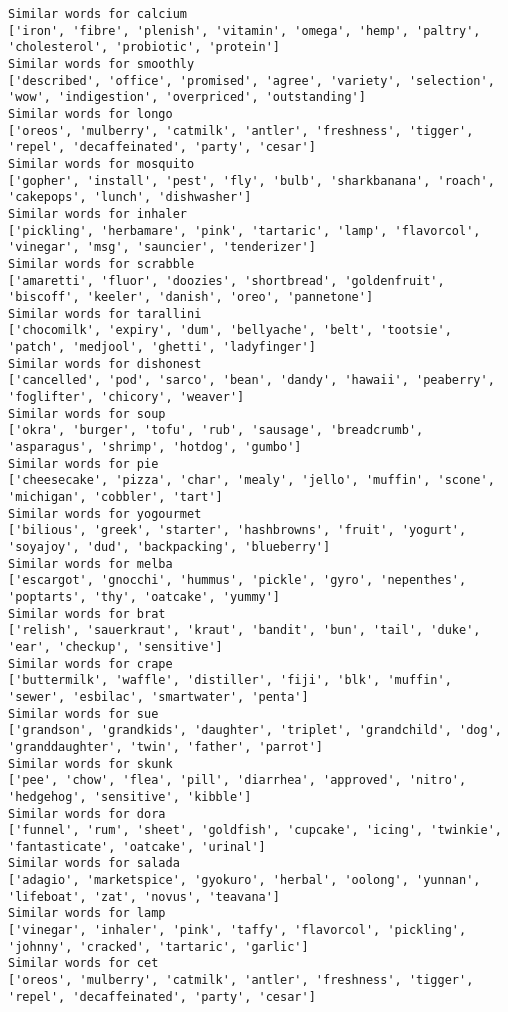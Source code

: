 \documentclass[11pt]{article}
\begin{document}
\begin{Verbatim}[commandchars=\\\{\}]
Similar words for calcium
['iron', 'fibre', 'plenish', 'vitamin', 'omega', 'hemp', 'paltry', 'cholesterol', 'probiotic', 'protein']
Similar words for smoothly
['described', 'office', 'promised', 'agree', 'variety', 'selection', 'wow', 'indigestion', 'overpriced', 'outstanding']
Similar words for longo
['oreos', 'mulberry', 'catmilk', 'antler', 'freshness', 'tigger', 'repel', 'decaffeinated', 'party', 'cesar']
Similar words for mosquito
['gopher', 'install', 'pest', 'fly', 'bulb', 'sharkbanana', 'roach', 'cakepops', 'lunch', 'dishwasher']
Similar words for inhaler
['pickling', 'herbamare', 'pink', 'tartaric', 'lamp', 'flavorcol', 'vinegar', 'msg', 'sauncier', 'tenderizer']
Similar words for scrabble
['amaretti', 'fluor', 'doozies', 'shortbread', 'goldenfruit', 'biscoff', 'keeler', 'danish', 'oreo', 'pannetone']
Similar words for tarallini
['chocomilk', 'expiry', 'dum', 'bellyache', 'belt', 'tootsie', 'patch', 'medjool', 'ghetti', 'ladyfinger']
Similar words for dishonest
['cancelled', 'pod', 'sarco', 'bean', 'dandy', 'hawaii', 'peaberry', 'foglifter', 'chicory', 'weaver']
Similar words for soup
['okra', 'burger', 'tofu', 'rub', 'sausage', 'breadcrumb', 'asparagus', 'shrimp', 'hotdog', 'gumbo']
Similar words for pie
['cheesecake', 'pizza', 'char', 'mealy', 'jello', 'muffin', 'scone', 'michigan', 'cobbler', 'tart']
Similar words for yogourmet
['bilious', 'greek', 'starter', 'hashbrowns', 'fruit', 'yogurt', 'soyajoy', 'dud', 'backpacking', 'blueberry']
Similar words for melba
['escargot', 'gnocchi', 'hummus', 'pickle', 'gyro', 'nepenthes', 'poptarts', 'thy', 'oatcake', 'yummy']
Similar words for brat
['relish', 'sauerkraut', 'kraut', 'bandit', 'bun', 'tail', 'duke', 'ear', 'checkup', 'sensitive']
Similar words for crape
['buttermilk', 'waffle', 'distiller', 'fiji', 'blk', 'muffin', 'sewer', 'esbilac', 'smartwater', 'penta']
Similar words for sue
['grandson', 'grandkids', 'daughter', 'triplet', 'grandchild', 'dog', 'granddaughter', 'twin', 'father', 'parrot']
Similar words for skunk
['pee', 'chow', 'flea', 'pill', 'diarrhea', 'approved', 'nitro', 'hedgehog', 'sensitive', 'kibble']
Similar words for dora
['funnel', 'rum', 'sheet', 'goldfish', 'cupcake', 'icing', 'twinkie', 'fantasticate', 'oatcake', 'urinal']
Similar words for salada
['adagio', 'marketspice', 'gyokuro', 'herbal', 'oolong', 'yunnan', 'lifeboat', 'zat', 'novus', 'teavana']
Similar words for lamp
['vinegar', 'inhaler', 'pink', 'taffy', 'flavorcol', 'pickling', 'johnny', 'cracked', 'tartaric', 'garlic']
Similar words for cet
['oreos', 'mulberry', 'catmilk', 'antler', 'freshness', 'tigger', 'repel', 'decaffeinated', 'party', 'cesar']

\end{Verbatim}
\end{document}
